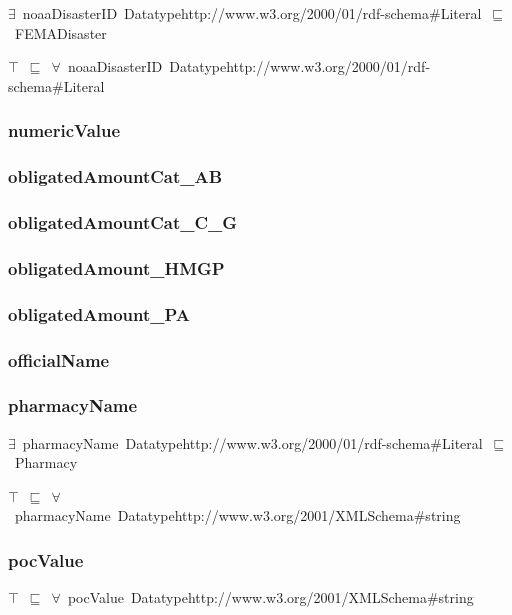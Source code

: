 \documentclass{article}
\begin{document}
\ensuremath{\exists}~noaaDisasterID~Datatypehttp://www.w3.org/2000/01/rdf-schema#Literal~\ensuremath{\sqsubseteq}~FEMADisaster

\ensuremath{\top}~\ensuremath{\sqsubseteq}~\ensuremath{\forall}~noaaDisasterID~Datatypehttp://www.w3.org/2000/01/rdf-schema#Literal

\subsubsection*{numericValue}

\subsubsection*{obligatedAmountCat\_AB}

\subsubsection*{obligatedAmountCat\_C\_G}

\subsubsection*{obligatedAmount\_HMGP}

\subsubsection*{obligatedAmount\_PA}

\subsubsection*{officialName}

\subsubsection*{pharmacyName}

\ensuremath{\exists}~pharmacyName~Datatypehttp://www.w3.org/2000/01/rdf-schema#Literal~\ensuremath{\sqsubseteq}~Pharmacy

\ensuremath{\top}~\ensuremath{\sqsubseteq}~\ensuremath{\forall}~pharmacyName~Datatypehttp://www.w3.org/2001/XMLSchema#string

\subsubsection*{pocValue}

\ensuremath{\top}~\ensuremath{\sqsubseteq}~\ensuremath{\forall}~pocValue~Datatypehttp://www.w3.org/2001/XMLSchema#string
\end{document}
